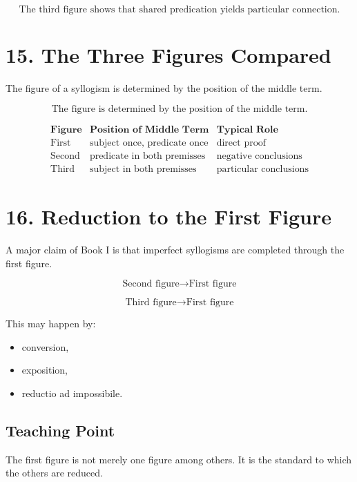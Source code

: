 \documentclass[12pt]{article}
\begin{document}
\[
\boxed{
\text{The third figure shows that shared predication yields particular connection.}
}
\]

\section*{15. The Three Figures Compared}

The figure of a syllogism is determined by the position of the middle term.

\[
\boxed{
\text{The figure is determined by the position of the middle term.}
}
\]

\[
\begin{array}{c|c|c}
\textbf{Figure} & \textbf{Position of Middle Term} & \textbf{Typical Role} \\
\hline
\text{First} & \text{subject once, predicate once} & \text{direct proof} \\
\text{Second} & \text{predicate in both premisses} & \text{negative conclusions} \\
\text{Third} & \text{subject in both premisses} & \text{particular conclusions}
\end{array}
\]

\section*{16. Reduction to the First Figure}

A major claim of Book I is that imperfect syllogisms are completed through the
first figure.

\[
\text{Second figure} \rightarrow \text{First figure}
\]

\[
\text{Third figure} \rightarrow \text{First figure}
\]

This may happen by:

\begin{itemize}[itemsep=0.25em]
    \item conversion,
    \item exposition,
    \item reductio ad impossibile.
\end{itemize}

\subsection*{Teaching Point}

The first figure is not merely one figure among others. It is the standard to
which the others are reduced.
\end{document}
